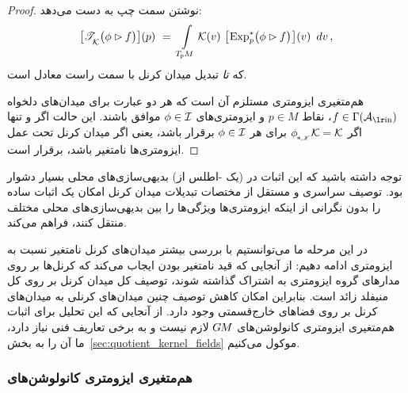 \begin{proof}
    نوشتن سمت چپ به دست می‌دهد:
    \begin{align}
        \big[ \TK \big(\phi \rhd f\big) \big](p)
        \ =\ \int\limits_{\TpM}
                \K(v) \ 
                \big[\mkern-2mu \Expsp\!\big( \phi\rhd f\big) \mkern1mu\big] (v)
                \,\ dv \,,
    \end{align}
    که \emph{تا} تبدیل میدان کرنل با سمت راست معادل است.

    هم‌متغیری ایزومتری مستلزم آن است که هر دو عبارت برای میدان‌های دلخواه $f\in\Gamma(\Ain)$، نقاط $p\in M$ و ایزومتری‌های $\phi\in\mathcal{I}$ موافق باشند.
    این حالت اگر و تنها اگر $\dphiK \K = \K$ برای هر $\phi \in \mathcal{I}$ برقرار باشد، یعنی اگر میدان کرنل تحت عمل ایزومتری‌ها نامتغیر باشد، برقرار است.
\end{proof}
توجه داشته باشید که این اثبات در (یک -اطلس از) بدیهی‌سازی‌های محلی بسیار دشوار بود.
توصیف سراسری و مستقل از مختصات تبدیلات میدان کرنل امکان یک اثبات ساده را بدون نگرانی از اینکه ایزومتری‌ها ویژگی‌ها را بین بدیهی‌سازی‌های محلی مختلف منتقل کنند، فراهم می‌کند.


در این مرحله ما می‌توانستیم با بررسی بیشتر میدان‌های کرنل نامتغیر نسبت به ایزومتری ادامه دهیم:
از آنجایی که قید نامتغیر بودن ایجاب می‌کند که کرنل‌ها بر روی مدارهای گروه ایزومتری به اشتراک گذاشته شوند، توصیف کل میدان کرنل بر روی کل منیفلد زائد است.
بنابراین امکان کاهش توصیف چنین میدان‌های کرنلی به میدان‌های کرنل بر روی فضاهای خارج‌قسمتی وجود دارد.
از آنجایی که این تحلیل برای اثبات هم‌متغیری ایزومتری کانولوشن‌های $G\mkern-1.4muM$ لازم نیست و به برخی تعاریف فنی نیاز دارد، ما آن را به بخش~\ref{sec:quotient_kernel_fields} موکول می‌کنیم.




















\subsubsection{هم‌متغیری ایزومتری کانولوشن‌های }
\label{sec:isom_equiv_GM_conv}

